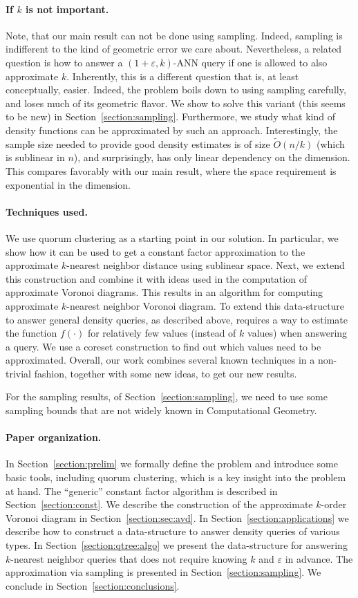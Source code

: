 \documentclass[12pt]{article}
\makeatletter
\newcommand{\Term}[1]{\textsf{#1}}
\newcommand{\TermI}[1]{\Term{#1}\index{#1@\Term{#1}}}
\theoremstyle{remark}{\theorembodyfont{\rm} \newtheorem{remark}[theorem]{Remark}}
\newcommand{\secref}[1]{Section~\ref{section:#1}}
\newcommand{\eps}{{\varepsilon}}\newcommand{\divides}{|}
\newcommand{\ANN}{\TermI{ANN}\xspace}
\newcommand{\Otilde}{\widetilde{O}}
\makeatother
\begin{document}
\paragraph{If $k$ is not important.}
Note, that our main result can not be done using sampling. Indeed,
sampling is indifferent to the kind of geometric error we care
about. Nevertheless, a related question is how to answer a
$(1+\eps,k)$-\ANN query if one is allowed to also approximate $k$.
Inherently, this is a different question that is, at least
conceptually, easier. Indeed, the problem boils down to using sampling
carefully, and loses much of its geometric flavor. We show to solve
this variant (this seems to be new) in \secref{sampling}. Furthermore,
we study what kind of density functions can be approximated by such an
approach. Interestingly, the sample size needed to provide good
density estimates is of size $\Otilde(n/k)$ (which is sublinear in
$n$), and surprisingly, has only linear dependency on the
dimension. This compares favorably with our main result, where the
space requirement is exponential in the dimension.


\paragraph{Techniques used.}
We use quorum clustering as a starting point in our solution. In
particular, we show how it can be used to get a constant
factor approximation to the approximate $k$-nearest neighbor distance
using sublinear space.  Next, we extend this construction and combine
it with ideas used in the computation of approximate Voronoi
diagrams. This results in an algorithm for computing approximate
$k$-nearest neighbor Voronoi diagram.  To extend this data-structure
to answer general density queries, as described above, requires a
way to estimate the function $f(\cdot)$ for relatively few values
(instead of $k$ values) when answering a query. We use a coreset
construction to find out which values need to be approximated.
Overall, our work combines several known techniques in a non-trivial
fashion, together with some new ideas, to get our new results.

For the sampling results, of \secref{sampling}, we need to use some
sampling bounds that are not widely known in Computational Geometry.


\paragraph{Paper organization.}
In \secref{prelim} we formally define the problem and introduce some
basic tools, including quorum clustering, which is a key insight into
the problem at hand.  The ``generic'' constant factor algorithm is
described in \secref{const}.  We describe the construction of the
approximate $k$-order Voronoi diagram in \secref{sec:avd}.  In
\secref{applications} we describe how to construct a data-structure to
answer density queries of various types. In \secref{qtree:algo} we
present the data-structure for answering $k$-nearest neighbor queries
that does not require knowing $k$ and $\eps$ in advance.  The
approximation via sampling is presented in \secref{sampling}.
We conclude in \secref{conclusions}.
\end{document}
